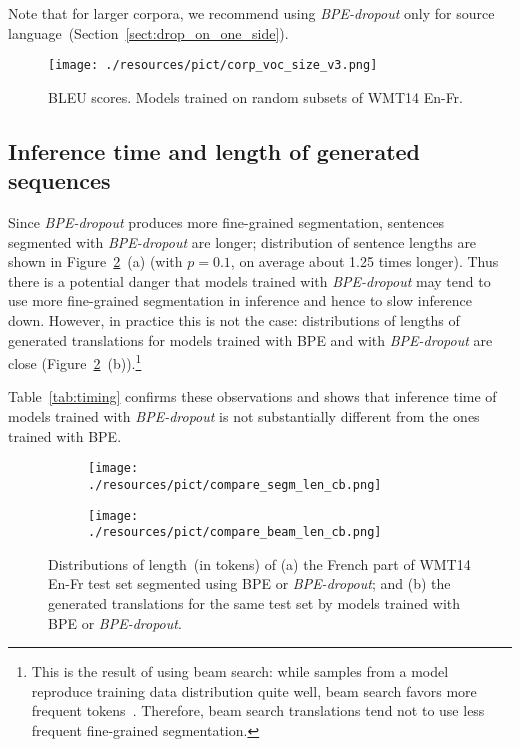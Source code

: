 \documentclass[11pt,a4paper]{article}
\begin{document}
Note that for larger corpora, we recommend using \textit{BPE-dropout} only for source language~(Section~\ref{sect:drop_on_one_side}).

\label{sect:corpora_voc_size}
\begin{figure}[t!]
    \centering
    \texttt{[image: ./resources/pict/corp\_voc\_size\_v3.png]}
    \caption{BLEU scores. Models trained on random subsets of WMT14 En-Fr.}
    \label{fig:corpora_size}
\end{figure}

\subsection{Inference time and length of generated sequences}
\label{sect:inference_time}


Since \textit{BPE-dropout} produces more fine-grained segmentation, sentences segmented with \textit{BPE-dropout} are longer; distribution of sentence lengths are shown in Figure~\ref{fig:output_length}~(a) (with $p=0{.}1$,  on average about 1{.}25 times longer). Thus there is a potential danger that models trained with \textit{BPE-dropout} may tend to use more fine-grained segmentation in inference and hence to slow inference down. However, in practice this is not the case: distributions of lengths of generated translations for models trained with BPE and with \textit{BPE-dropout} are close (Figure~\ref{fig:output_length}~(b)).\footnote{This is the result of using beam search: while samples from a model reproduce training data distribution quite well, beam search favors more frequent tokens~\cite{ott2018analyzing}. Therefore, beam search translations tend not to use less frequent fine-grained segmentation.}


Table~\ref{tab:timing} confirms these observations and shows that inference time of models trained with \textit{BPE-dropout} is not substantially different from the ones trained with BPE. 


\begin{figure}[t!]
    \centering
    \begin{subfigure}[b]{0.23\textwidth}
        \texttt{[image: ./resources/pict/compare\_segm\_len\_cb.png]}
        \caption{}
    \end{subfigure}
    \begin{subfigure}[b]{0.23\textwidth}
       \texttt{[image: ./resources/pict/compare\_beam\_len\_cb.png]}
        \caption{}
    \end{subfigure}
    \caption{Distributions of length~(in tokens) of (a) the French part of WMT14 En-Fr test set segmented using BPE or  \textit{BPE-dropout}; and (b) the generated translations for the same test set by models trained with BPE or \textit{BPE-dropout}.}
    \label{fig:output_length}
\end{figure}
\end{document}
